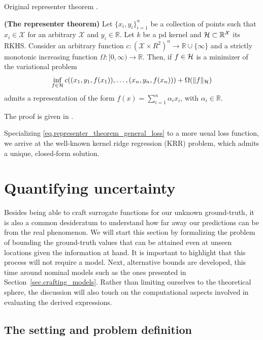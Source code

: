 Original representer theorem \cite{kimeldorf1971some}.

\begin{theorem}
	\textbf{(The representer theorem)}
	Let $\{x_i,y_i\}_{i=1}^n$ be a collection of points such that $x_i \in \mathcal{X}$ for an arbitrary $\mathcal{X}$ and $y_i \in \mathbb{R}$. Let $k$ be a \ac{pd} kernel and $\mathcal{H} \subset \mathbb{R}^\mathcal{X}$ its RKHS. Consider an arbitrary function $c : (\mathcal{X} \times R^2)^n \rightarrow \mathbb{R} \cup \{\infty\}$ and a strictly monotonic increasing function $\Omega: [0,\infty) \rightarrow \mathbb{R}$. Then, if $f \in \mathcal{H}$ is a minimizer of the variational problem
	\begin{equation}
		\label{eq.representer_theorem_general_loss}
		\inf_{f\in \mathcal{H}} c((x_1,y_1,f(x_1)),\dots,(x_n,y_n,f(x_n))) + \Omega(\Vert f \Vert_{\mathcal{H}})
	\end{equation}
	admits a representation of the form $f(x) = \sum_{i=1}^n \alpha_i x_i$, with $\alpha_i \in \mathbb{R}$. 
\end{theorem}
\begin{my_proof}
	The proof is given in \cite{scholkopf2001generalized}.
\end{my_proof}

Specializing \eqref{eq.representer_theorem_general_loss} to a more usual loss function, we arrive at the well-known kernel ridge regression (KRR) problem, which admits a unique, closed-form solution.


\section{Quantifying uncertainty}
\label{sec.quant_uncert}

Besides being able to craft surrogate functions for our unknown ground-truth, it is also a common desideratum to understand how far away our predictions can be from the real phenomenon. We will start this section by formalizing the problem of bounding the ground-truth values that can be attained even at unseen locations given the information at hand. It is important to highlight that this process will not require a model. Next, alternative bounds are developed, this time around nominal models such as the ones presented in Section~\ref{sec.crafting_models}. Rather than limiting ourselves to the theoretical sphere, the discussion will also touch on the computational aspects involved in evaluating the derived expressions.

\subsection{The setting and problem definition}

